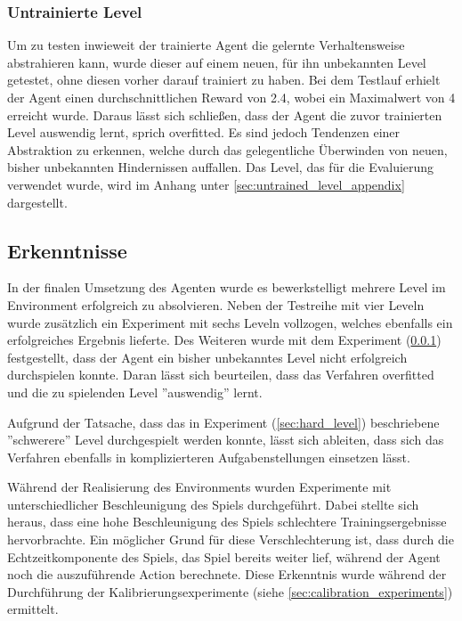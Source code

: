 \documentclass[11pt]{scrartcl}
\begin{document}
\subsubsection{Untrainierte Level}
\label{sec:untrained_level}
Um zu testen inwieweit der trainierte Agent die gelernte Verhaltensweise abstrahieren
kann, wurde dieser auf einem neuen, für ihn unbekannten Level getestet, ohne diesen
vorher darauf trainiert zu haben. Bei dem Testlauf erhielt der Agent einen durchschnittlichen
Reward von 2.4, wobei ein Maximalwert von 4 erreicht wurde. Daraus lässt sich schließen,
dass der Agent die zuvor trainierten Level auswendig lernt, sprich overfitted. Es sind
jedoch Tendenzen einer Abstraktion zu erkennen, welche durch das gelegentliche Überwinden
von neuen, bisher unbekannten Hindernissen auffallen. Das Level, das für die Evaluierung
verwendet wurde, wird im Anhang unter \ref{sec:untrained_level_appendix} dargestellt.

\newpage
\subsection{Erkenntnisse}
\label{sec:results}
In der finalen Umsetzung des Agenten wurde es bewerkstelligt mehrere Level im Environment
erfolgreich zu absolvieren. Neben der Testreihe mit vier Leveln wurde zusätzlich ein
Experiment mit sechs Leveln vollzogen, welches ebenfalls ein erfolgreiches Ergebnis
lieferte. Des Weiteren wurde mit dem Experiment (\ref{sec:untrained_level}) festgestellt,
dass der Agent ein bisher unbekanntes Level nicht erfolgreich durchspielen konnte. Daran
lässt sich beurteilen, dass das Verfahren overfitted und die zu spielenden Level ''auswendig''
lernt.

Aufgrund der Tatsache, dass das in Experiment (\ref{sec:hard_level})
beschriebene ''schwerere'' Level durchgespielt werden konnte, lässt sich ableiten, dass sich
das Verfahren ebenfalls in komplizierteren Aufgabenstellungen einsetzen lässt. %

Während der Realisierung des Environments wurden Experimente mit unterschiedlicher Beschleunigung
des Spiels durchgeführt. Dabei stellte sich heraus, dass eine hohe Beschleunigung des Spiels
schlechtere Trainingsergebnisse hervorbrachte. Ein möglicher Grund für diese Verschlechterung ist,
dass durch die Echtzeitkomponente des Spiels, das Spiel bereits weiter lief, während der Agent noch
die auszuführende Action berechnete. Diese Erkenntnis wurde während der Durchführung der
Kalibrierungsexperimente (siehe \ref{sec:calibration_experiments}) ermittelt.
\end{document}
